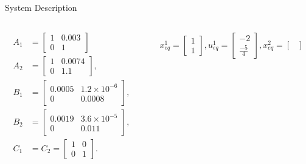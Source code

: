 \begin{slide}{System Description}
  \begin{columns}[c]
    \begin{column}{0.38\textwidth}
      \begin{equation}
        \begin{aligned}
          A_1 & =
          \begin{bmatrix}
            1 & 0.003 \\
            0 & 1
          \end{bmatrix}          \\
          A_2 & = \begin{bmatrix}
            1 & 0.0074 \\
            0 & 1.1
          \end{bmatrix}, \\
          B_1 & =
          \begin{bmatrix}
            0.0005 & 1.2\times{}10^{-6} \\
            0      & 0.0008
          \end{bmatrix},         \\
          B_2 & = \begin{bmatrix}
            0.0019 & 3.6\times{}10^{-5} \\
            0      & 0.011
          \end{bmatrix}, \\
          C_1 & = C_2 =
          \begin{bmatrix}
            1 & 0 \\
            0 & 1
          \end{bmatrix}.         \\
        \end{aligned}
      \end{equation}
    \end{column}%
    \hfill%
    \begin{column}{0.58\textwidth}
      \begin{equation}
        \begin{aligned}
          x_{eq}^1 = \begin{bmatrix}
            1 \\ 1
          \end{bmatrix},
          u_{eq}^1 = \begin{bmatrix}
            -2 \\ \frac{-5}{4}
          \end{bmatrix},
          x_{eq}^2 = \begin{bmatrix}

\end{bmatrix}
\end{aligned}
\end{equation}
\end{column}
\end{columns}
\end{slide}
